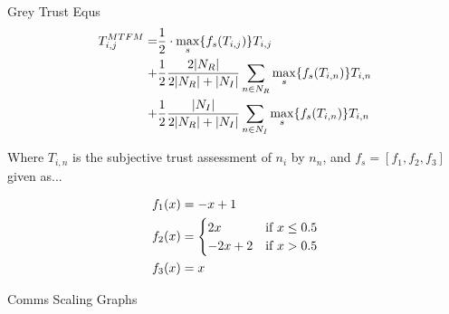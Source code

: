 \documentclass{beamer}
\begin{document}
\begin{frame}[allowframebreaks]{Grey Trust Equs}
  \begin{align}
    \label{eq:networkeffects}
    T_{i,j}^{MTFM}=&\frac{1}{2} \cdot \max_s\{f_s(T_{i,j})\} T_{i,j}\\ \notag
    +&\frac{1}{2} \frac{2|N_R| }{2|N_R| + |N_I|}\sum_{n \in N_R} \max_s\{f_s(T_{i,n})\} T_{i,n}\\ \notag
    +&\frac{1}{2} \frac{|N_I| }{2|N_R| + |N_I|}\sum_{n \in N_I} \max_s\{f_s(T_{i,n})\} T_{i,n} 
  \end{align}

  Where $T_{i,n}$ is the subjective trust assessment of $n_i$ by $n_n$, and $f_s = [ f_1,f_2, f_3]$ given as...

  \framebreak

  \begin{align}
    \label{eq:whitenization}
    f_1(x)&= -x+1\notag\\
    f_2(x)&= 
    \begin{cases}
      2x & \text{if }x\leq 0.5\\
      -2x+2 & \text{if }x>0.5
    \end{cases}\\
    f_3(x)&= x\notag
  \end{align}
\hyperlink{fig:node_relationships}{}
\end{frame}

\begin{frame}[allowframebreaks]{Comms Scaling Graphs}

\setcounter{subfigure}{0}%
  \begin{figure}[h]
    \centering
    \\
    \label{fig:CommsThroughputRatios}
  \end{figure}
\hyperlink{scaling}{}

\end{frame}
\end{document}
